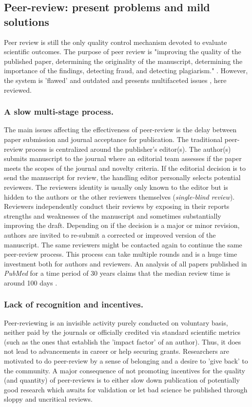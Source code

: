 \documentclass[runningheads]{llncs}
\begin{document}
\subsection{Peer-review: present problems and mild solutions}
Peer review is still the only quality control mechanism devoted to evaluate scientific outcomes. The purpose of peer review is "improving the quality of the published paper, determining the originality of the manuscript, determining the importance of the findings, detecting fraud, and detecting plagiarism." \cite{Gropp-PeerRevStress}. However, the system is 'ﬂawed' and outdated \cite{Smith2006} and presents multifaceted issues \cite{Walker2015-trends}, here reviewed.
\subsubsection{A slow multi-stage process.} The main issues affecting the effectiveness of peer-review is the delay between paper submission and journal acceptance for publication. The traditional peer-review process is centralized around the publisher's editor(s). The author(s) submits manuscript to the journal where an editorial team assesses if the paper meets the scopes of the journal and novelty criteria. If the editorial decision is to send the manuscript for review, the handling editor personally selects potential reviewers. The reviewers identity is usually only known to the editor but is hidden to the authors or the other reviewers themselves (\emph{single-blind review}). Reviewers independently conduct their reviews by exposing in their reports strengths and weaknesses of the manuscript and sometimes substantially improving the draft. Depending on if the decision is a major or minor revision, authors are invited to re-submit a corrected or improved version of the manuscript. The same reviewers might be contacted again to continue the same peer-review process. This process can take multiple rounds and is a huge time investment both for authors and reviewers. An analysis of all papers published in \emph{PubMed} for a time period of 30 years claims that the median review time is around 100 days \cite{Kendall-peerrev}.
\subsubsection{Lack of recognition and incentives.} Peer-reviewing is an invisible activity purely conducted on voluntary basis, neither paid by the journals or officially credited via standard scientific metrics (such as the ones that establish the 'impact factor' of an author). Thus, it does not lead to advancements in career or help securing grants. Researchers are motivated to do peer-review by a sense of belonging and a desire to 'give back' to the community. A major consequence of not promoting incentives for the quality (and quantity) of peer-reviews is to either slow down publication of potentially good research which awaits for validation \cite{HauserIncent} or let bad science be published through sloppy and uncritical reviews.
\end{document}
